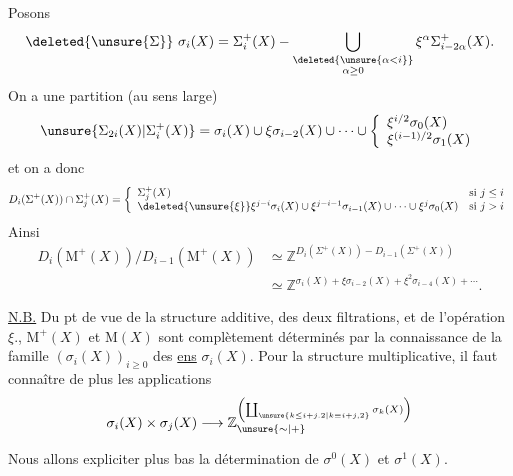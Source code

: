 Posons
\[
\deleted{\unsure{\Sigma}}\ \sigma_i(X)=
\Sigma_i^+(X)-\bigcup_{\substack{\deleted{\unsure{\alpha<i}}\\\alpha\geq0}}
\xi^\alpha\Sigma_{i-2\alpha}^+(X).
\]
On a une partition (au sens large)
\[
\unsure{\Sigma_{2i}(X)|\Sigma_i^+(X)}
=\sigma_i(X)\cup\xi\sigma_{i-2}(X)\cup\cdots\cup
\left\{\begin{array}{l}
\xi^{i/2}\sigma_0(X)\\
\xi^{(i-1)/2}\sigma_1(X)
\end{array}\right.
\]
et on a donc
\[
D_i(\Sigma^+(X))\cap\Sigma_j^+(X)=
\left\{\begin{array}{ll}
\Sigma_j^+(X)&\text{si }j\leq i\\
\deleted{\unsure{\xi}}\xi^{j-i}\sigma_i(X)\cup
\xi^{j-i-1}\sigma_{i-1}(X)\cup\cdots\cup\xi^j\sigma_0(X)
&\text{si }j>i
\end{array}\right.
\]
Ainsi
\[
\begin{aligned}
D_i(\mathrm{M}^+(X))/D_{i-1}(\mathrm{M}^+(X))
&\simeq\mathbb{Z}^{D_i(\Sigma^+(X))-D_{i-1}(\Sigma^+(X))}\\
&\simeq\mathbb{Z}^{\sigma_i(X)+\xi\sigma_{i-2}(X)+\xi^2\sigma_{i-4}(X)+\cdots}.
\end{aligned}
\]

\uline{N.B.} Du pt de vue de la structure additive,
des deux filtrations, et de l'opération
$\xi.$, $\mathrm{M}^+(X)$ et $\mathrm{M}(X)$ sont complètement
déterminés par la connaissance de
la famille $(\sigma_i(X))_{i\geq0}$ des \uline{ens} $\sigma_i(X)$.
Pour la structure multiplicative, il faut
connaître de plus les applications
\[
\sigma_i(X)\times\sigma_j(X)\longrightarrow
\mathbb{Z}_{\unsure{\sim|+}}^{\left(\coprod_{\unsure{k\leq i+j.2|k\equiv i+j,2}}
\sigma_k(X)\right)}
\]

Nous allons expliciter plus bas la détermination
de $\sigma^0(X)$ et $\sigma^1(X)$.

